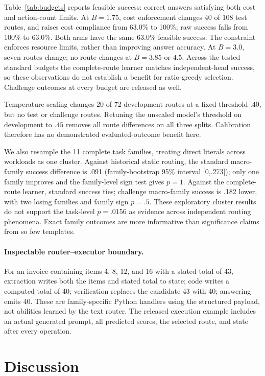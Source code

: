 \documentclass[letterpaper]{article} %
\begin{document}
Table~\ref{tab:budgets} reports feasible success: correct answers satisfying both cost and action-count limits. At $B=1.75$, cost enforcement changes 40 of 108 test routes, and raises cost compliance from 63.0\% to 100\%; raw success falls from 100\% to 63.0\%. Both arms have the same 63.0\% feasible success. The constraint enforces resource limits, rather than improving answer accuracy. At $B=3.0$, seven routes change; no route changes at $B=3.85$ or $4.5$. Across the tested standard budgets the complete-route learner matches independent-head success, so these observations do not establish a benefit for ratio-greedy selection. Challenge outcomes at every budget are released as well.

Temperature scaling changes 20 of 72 development routes at a fixed threshold $.40$, but no test or challenge routes. Retuning the unscaled model's threshold on development to $.45$ removes all route differences on all three splits. Calibration therefore has no demonstrated evaluated-outcome benefit here.

We also resample the 11 complete task families, treating direct literals across workloads as one cluster. Against historical static routing, the standard macro-family success difference is .091 (family-bootstrap 95\% interval [0,.273]); only one family improves and the family-level sign test gives $p=1$. Against the complete-route learner, standard success ties; challenge macro-family success is .182 lower, with two losing families and family sign $p=.5$. These exploratory cluster results do not support the task-level $p=.0156$ as evidence across independent routing phenomena. Exact family outcomes are more informative than significance claims from so few templates.

\paragraph{Inspectable router--executor boundary.}
For an invoice containing items 4, 8, 12, and 16 with a stated total of 43, extraction writes both the items and stated total to state; code writes a computed total of 40; verification replaces the candidate 43 with 40; answering emits 40. These are family-specific Python handlers using the structured payload, not abilities learned by the text router. The released execution example includes an actual generated prompt, all predicted scores, the selected route, and state after every operation.

\section{Discussion}
\end{document}
